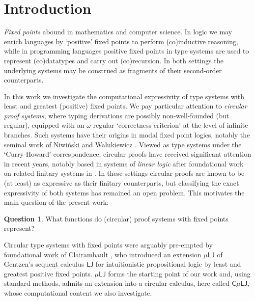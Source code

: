 \documentclass[10pt,a4paper]{amsart}
\theoremstyle{plain}
\theoremstyle{definition}
\newtheorem{question}[question]{Question}
\theoremstyle{plain}
\theoremstyle{definition} %
\newcommand{\LJ}{\mathsf{LJ}}
\newcommand{\muLJ}{\mu\LJ}
\newcommand{\circular}{\mathsf C}
\newcommand{\cmuLJ}{\circular\muLJ}
\begin{document}
\section{Introduction}
\label{sec:intro}
\emph{Fixed points} abound in mathematics and computer science.
In logic we may enrich languages by `positive' fixed points to perform (co)inductive reasoning, while in
programming languages positive fixed points in type systems are used to represent (co)datatypes and carry out (co)recursion.
In both settings the underlying systems may be construed as fragments of their second-order counterparts.

In this work we investigate the computational expressivity of type systems with least and greatest (positive) fixed points.
We pay particular attention to \emph{circular proof systems}, where typing derivations are possibly non-well-founded (but regular), equipped with an $\omega$-regular `correctness criterion' at the level of infinite branches.
Such systems have their origins in modal fixed point logics, notably the seminal work of Niwi\'nski and Walukiewicz \cite{NiwWal96:games-for-mu-calc}.
Viewed as type systems under the `Curry-Howard' correspondence, circular proofs have received significant attention in recent years, notably based in systems of \emph{linear logic} \cite{BaeldeDS16Infinitaryprooftheory,EhrJaf21:cat-models-muLL,EhrJafSau21:totality-CmuMALL,BDKS22:bouncing-threads,DeSau19:infinets1,DePelSau:infinets2,DeJafSau22:phase-semantics} after foundational work on related finitary systems in \cite{BaeldeMiller07,Baelde12}.
In these settings circular proofs are known to be (at least) as expressive as their finitary counterparts, but classifying the exact expressivity of both systems has remained an open problem.
This motivates the main question of the present work:

\smallskip

\begin{question}
\label{question:main}
What functions do (circular) proof systems with fixed points represent?
\end{question}


\medskip


Circular type systems with fixed points were arguably pre-empted by foundational work of Clairambault \cite{Clairambault09}, who introduced an extension $\muLJ$ of Gentzen's sequent calculus $\LJ$ for intuitionistic propositional logic by least and greatest positive fixed points.
$\muLJ$ forms the starting point of our work and, using standard methods, admits an extension into a circular calculus, here called $\cmuLJ$, whose computational content we also investigate.
\end{document}
